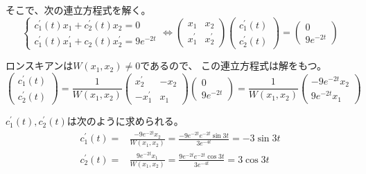 \documentclass[12pt,b5paper]{ltjsarticle}
\begin{document}
\begin{enumerate}
      そこで、次の連立方程式を解く。
      \begin{equation}
       \begin{cases}
        c_1^{\prime}(t)x_1 + c_2^{\prime}(t)x_2 =0\\
        c_1^{\prime}(t)x_1^{\prime} + c_2(t)x_2^{\prime} =9e^{-2t}
       \end{cases}
       \Longleftrightarrow
       \begin{pmatrix}
         x_1 & x_2\\
         x_1^{\prime} & x_2^{\prime}
       \end{pmatrix}
       \begin{pmatrix}
        c_1^{\prime}(t) \\ c_2^{\prime}(t)
       \end{pmatrix}
       =
       \begin{pmatrix}
        0 \\ 9e^{-2t}
       \end{pmatrix}
      \end{equation}

      ロンスキアンは$W(x_1,x_2)\ne0$であるので、
      この連立方程式は解をもつ。
      \begin{equation}
       \begin{pmatrix}
        c_1^{\prime}(t) \\ c_2^{\prime}(t)
       \end{pmatrix}
       =
       \frac{1}{W(x_1,x_2)}
       \begin{pmatrix}
         x_2^{\prime} & -x_2\\
         -x_1^{\prime} & x_1
       \end{pmatrix}
       \begin{pmatrix}
        0 \\ 9e^{-2t}
       \end{pmatrix}
       =
       \frac{1}{W(x_1,x_2)}
       \begin{pmatrix}
         -9e^{-2t}x_2\\
          9e^{-2t}x_1
       \end{pmatrix}
      \end{equation}

      $c_1^{\prime}(t),c_2^{\prime}(t)$は次のように求められる。
      \begin{align}
       c_1^{\prime}(t)
       =& \frac{-9e^{-2t}x_2}{W(x_1,x_2)}
       = \frac{-9e^{-2t}e^{- 2t} \sin{3t}}{3e^{-4t}}
       = -3\sin{3t}\\
       c_2^{\prime}(t)
       =& \frac{9e^{-2t}x_1}{W(x_1,x_2)}
      = \frac{9e^{-2t}e^{- 2t} \cos{3t}}{3e^{-4t}}
       = 3\cos{3t}
      \end{align}


\end{enumerate}
\end{document}
